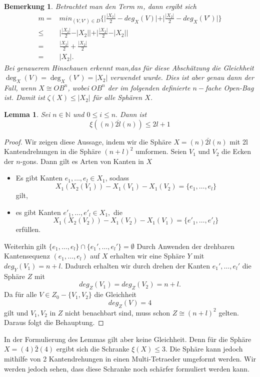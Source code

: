 \documentclass[12pt,titlepage,twoside,cleardoublepage]{article}
\theoremstyle{nummermitklammern}
\newtheorem{lemma}[temp]{Lemma}
\newtheorem{bemerkung}[temp]{Bemerkung}
\newtheorem{lemma}[zahl]{Lemma}
\newtheorem{bemerkung}[zahl]{Bemerkung}
\numberwithin{equation}{section}
\begin{document}
\begin{bemerkung}
Betrachtet man den Term $m$, dann ergibt sich
\begin{align*}
m=&min_{(V,V')\in D}\{\vert\frac{\vert X_2 \vert}{2}-deg_X(V)\vert +\vert \frac{\vert X_2 \vert}{2}-deg_X(V')\vert\}\\
\leq& \vert\frac{\vert X_2 \vert}{2}-\vert X_2\vert\vert +\vert \frac{\vert X_2 \vert}{2}-\vert X_2\vert\vert \\
=&\frac{\vert X_2 \vert}{2}+\frac{\vert X_2 \vert}{2}\\
=&\vert X_2 \vert.
\end{align*}
Bei genauerem Hinschauen erkennt man,das für diese Abschätzung die Gleichheit $\deg_X(V)=\deg_X(V')=\vert X_2 \vert$ verwendet wurde. Dies ist aber genau dann der Fall, wenn $X\cong OB^{n}$, wobei $OB^{n}$ der im folgenden definierte $n-$fache Open-Bag ist. 
Damit ist $\zeta (X)\leq \vert X_2 \vert$ für alle Sphären $X$. 
\end{bemerkung}
\begin{lemma}
Sei $n\in \mathbb{N}$ und $0\leq i \leq n.$ Dann ist 
\[
\xi((n)\bar{2l}(n))\leq 2l+1
\]
\end{lemma}
\begin{proof}
Wir zeigen diese Aussage, indem wir die Sphäre $X=(n)\bar{2l}(n)$ mit 2l Kantendrehungen in die Sphäre $(n+l)^2$ umformen. Seien $V_1$ und $V_2$ die Ecken der $n$-gons. Dann gilt es Arten von Kanten in $X$
\begin{itemize}
\item Es gibt Kanten $e_1,\ldots, e_l\in X_1$, sodass 
\[
X_1(X_2(V_1))-X_1(V_1)-X_1(V_2)=\{e_1,\ldots,e_l\}
\] gilt,
\item es gibt Kanten $e'_1,\ldots,e'_l\in X_1, $ die
\[
X_1(X_2(V_2))-X_1(V_2)-X_1(V_1)=\{e'_1,\ldots,e'_l\}
\] erfüllen.
\end{itemize}
Weiterhin gilt $\{e_1,\ldots,e_l\}\cap\{e_1',\ldots,e_l'\}=\emptyset$
Durch Anwenden der drehbaren Kantensequenz $(e_1,\ldots,e_l)$ auf $X$ erhalten wir eine Sphäre $Y$ mit $deg_Y(V_1)=n+l.$ Dadurch erhalten wir durch drehen der Kanten $e_1',\ldots,e_l'$ die Sphäre $Z$ mit 
\[
deg_Z(V_1)=deg_Z(V_2)=n+l.
\]
Da für alle $V\in Z_0-\{V_1,V_2\}$ die Gleichheit 
\[
deg_Z(V)=4
\]
gilt und $V_1,V_2$ in $Z$ nicht benachbart sind, muss schon $Z\cong (n+l)^2$ gelten. Daraus folgt die Behauptung.
\end{proof}
In der Formulierung des Lemmas gilt aber keine Gleichheit.
Denn für die Sphäre $X=(4)\bar{2}(4)$ ergibt sich die Schranke $\xi(X)\leq 3.$ Die Sphäre kann jedoch mithilfe von 2 Kantendrehungen in einen Multi-Tetraeder umgeformt werden. Wir werden jedoch sehen, dass diese Schranke noch schärfer formuliert werden kann. 
\end{document}
